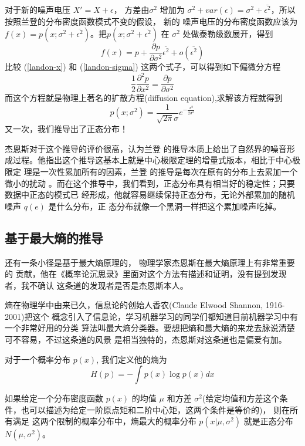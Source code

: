 对于新的噪声电压 $X' = X + \epsilon$， 方差由$\sigma^2$ 增加为 $\sigma^2 + var(\epsilon) =
\sigma^2 + \overline{\epsilon^2}$，所以按照兰登的分布密度函数模式不变的假设， 新的
噪声电压的分布密度函数应该为 $f(x) = p(x; \sigma^2 +  \overline{\epsilon^2})$。把$p(x;
\sigma^2 +  \overline{\epsilon^2})$ 在 $\sigma^2$ 处做泰勒级数展开，得到
\begin{equation}
\label{landon-sigma}
f(x) = p + \frac{\partial p}{\partial \sigma^2}\overline{\epsilon^2} + o(\overline{\epsilon^2})
\end{equation}
比较 (\ref{landon-x}) 和 (\ref{landon-sigma}) 这两个式子，可以得到如下偏微分方程
$$ \frac{1}{2} \frac{\partial^2 p}{\partial x^2} = \frac{\partial p}{\partial \sigma^2} $$
而这个方程就是物理上著名的扩散方程(diffusion equation),求解该方程就得到
$$ p(x; \sigma^2) = \frac{1}{\sqrt{2\pi}\sigma}e^{-\frac{x^2}{2\sigma^2}} $$
又一次，我们推导出了正态分布！

杰恩斯对于这个推导的评价很高，认为兰登 的推导本质上给出了自然界的噪音形
成过程。他指出这个推导这基本上就是中心极限定理的增量式版本，相比于中心极限定
理是一次性累加所有的因素，兰登 的推导是每次在原有的分布上去累加一个微小的扰动
。而在这个推导中，我们看到，正态分布具有相当好的稳定性；只要数据中正态的模式已
经形成，他就容易继续保持正态分布，无论外部累加的随机噪声 $q(e)$ 是什么分布，正
态分布就像一个黑洞一样把这个累加噪声吃掉。

\subsection{基于最大熵的推导}

还有一条小径是基于最大熵原理的， 物理学家杰恩斯在最大熵原理上有非常重要的
贡献，他在《概率论沉思录》里面对这个方法有描述和证明，没有提到发现者，我不确认
这条道的发现者是否是杰恩斯本人。

熵在物理学中由来已久，信息论的创始人香农(Claude Elwood Shannon, 1916-2001)把这个
概念引入了信息论，学习机器学习的同学们都知道目前机器学习中有一个非常好用的分类
算法叫最大熵分类器。要想把熵和最大熵的来龙去脉说清楚可不容易，不过这条道的风景
是相当独特的，杰恩斯对这条道也是偏爱有加。

对于一个概率分布 $p(x)$, 我们定义他的熵为
$$H(p) = -\int p(x)\log p(x) dx$$

如果给定一个分布密度函数 $p(x)$ 的均值 $\mu$ 和方差 $\sigma^2$(给定均值和方差这个条
件，也可以描述为给定一阶原点矩和二阶中心矩，这两个条件是等价的)， 则在所有满足
这两个限制的概率分布中，熵最大的概率分布 $p(x|\mu, \sigma^2)$ 就是正态分布
$N(\mu, \sigma^2)$。

